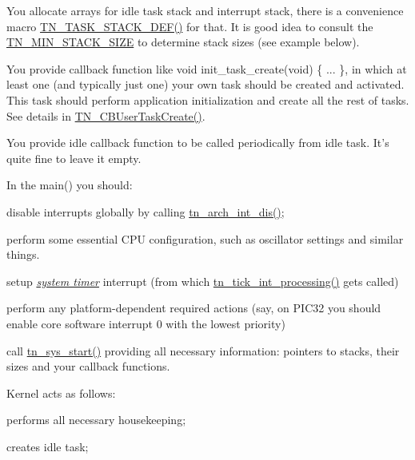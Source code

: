 \begin{DoxyItemize}
\item You allocate arrays for idle task stack and interrupt stack, there is a convenience macro {\ttfamily \hyperlink{tn__tasks_8h_a120e01d9dddd21ac11827595e88d7c36}{T\+N\+\_\+\+T\+A\+S\+K\+\_\+\+S\+T\+A\+C\+K\+\_\+\+D\+E\+F()}} for that. It is good idea to consult the {\ttfamily \hyperlink{tn__arch__example_8h_ad465f81e8ea15a530747b1147dbe4605}{T\+N\+\_\+\+M\+I\+N\+\_\+\+S\+T\+A\+C\+K\+\_\+\+S\+I\+Z\+E}} to determine stack sizes (see example below).
\item You provide callback function like {\ttfamily void init\+\_\+task\+\_\+create(void) \{ ... \}}, in which at least one (and typically just one) your own task should be created and activated. This task should perform application initialization and create all the rest of tasks. See details in {\ttfamily \hyperlink{tn__sys_8h_a94f785ff88dfca8746f34de59784883d}{T\+N\+\_\+\+C\+B\+User\+Task\+Create()}}.
\item You provide idle callback function to be called periodically from idle task. It's quite fine to leave it empty.
\item In the {\ttfamily main()} you should\+:
\begin{DoxyItemize}
\item disable interrupts globally by calling {\ttfamily \hyperlink{tn__arch_8h_a2b3f2294ac42a599662c573394b14c75}{tn\+\_\+arch\+\_\+int\+\_\+dis()}};
\item perform some essential C\+P\+U configuration, such as oscillator settings and similar things.
\item setup {\itshape \hyperlink{quick_guide_time_ticks}{system timer}} interrupt (from which {\ttfamily \hyperlink{tn__sys_8h_a944d96c7a5d442d271115b6cb22a085b}{tn\+\_\+tick\+\_\+int\+\_\+processing()}} gets called)
\item perform any platform-\/dependent required actions (say, on P\+I\+C32 you should enable core software interrupt 0 with the lowest priority)
\item call {\ttfamily \hyperlink{tn__sys_8h_a62ab25d9d8ca01c02d368968f19e49bf}{tn\+\_\+sys\+\_\+start()}} providing all necessary information\+: pointers to stacks, their sizes and your callback functions.
\end{DoxyItemize}
\item Kernel acts as follows\+:
\begin{DoxyItemize}
\item performs all necessary housekeeping;
\item creates idle task;

\end{DoxyItemize}
\end{DoxyItemize}
